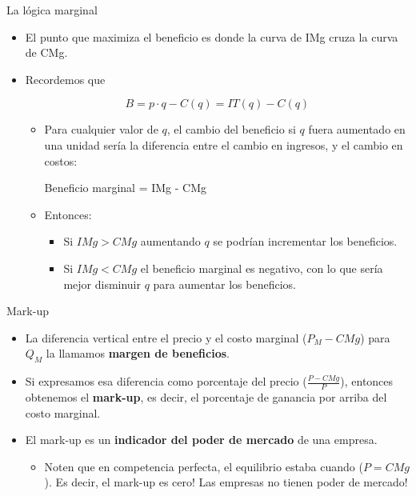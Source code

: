 \documentclass{beamer}
\begin{document}
\begin{frame}{La lógica marginal}
    \begin{itemize}
        \item El punto que maximiza el beneficio es donde la curva de IMg cruza la curva de CMg.
        \item Recordemos que

        \[ B = p \cdot q - C(q) = IT(q) - C(q)\]
        \begin{itemize}
            \item Para cualquier valor de $q$, el cambio del beneficio si $q$ fuera aumentado en una unidad sería la diferencia entre el cambio en ingresos, y el cambio en costos:
            
            \begin{center} 
                Beneficio marginal = IMg - CMg 
            \end{center}

            \item Entonces:
            \begin{itemize}
                \item Si $IMg > CMg$ aumentando $q$ se podrían incrementar los beneficios.
                \item Si $IMg < CMg$ el beneficio marginal es negativo, con lo que sería mejor disminuir $q$ para aumentar los beneficios.
            \end{itemize}
        \end{itemize}
    \end{itemize}
\end{frame}

\begin{frame}{Mark-up}
    \begin{itemize}
        \item La diferencia vertical entre el precio y el costo marginal ($P_M-CMg$) para $Q_M$ la llamamos \textbf{margen de beneficios}. \vspace{1mm}
        \item  Si expresamos esa diferencia como porcentaje del precio ($\frac{P-CMg}{P}$), entonces obtenemos el \textbf{mark-up}, es decir, el porcentaje de ganancia por arriba del costo marginal. \vspace{1mm}
        \item El mark-up es un \textbf{indicador del poder de mercado} de una empresa. 
        \begin{itemize}
            \item  Noten que en competencia perfecta, el equilibrio estaba cuando ($P=CMg$). Es decir, el mark-up es cero! Las empresas no tienen poder de mercado! \vspace{1mm}
        \end{itemize}
        \end{itemize}
\end{frame}
\end{document}
